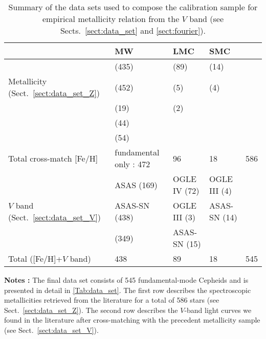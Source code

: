 \documentclass[article]{aa} %
\begin{document}
\begin{table*}[]
\caption{\label{Tab:bilan} Summary of the data sets used to compose the calibration sample for empirical metallicity relation from the $V$ band (see Sects.~\ref{sect:data_set} and \ref{sect:fourier}).}
\begin{center}
\begin{tabular}{l|l|l|l|c}
\hline
\hline
        &MW     &       LMC     &       SMC     &               \\
\hline
                &\cite{Luck2018} (435)          &       \cite{Romaniello2022}(89)       &       \cite{Romaniello2008}(14)       &               \\
Metallicity (Sect.~\ref{sect:data_set_Z})     & \cite{Groenewegen2018} (452)    &       \cite{Lemasle2017} (5)     &       \cite{Lemasle2017} (4)  &               \\
                &  \cite{Ripepi2021} (19)       &       \cite{Molinaro2012} (2)     &                                   &           \\
                &  \cite{Trentin2023} (44)       &              &                                   &            \\
                &  \cite{Kovtyukh2022} (54)       &             &                                   &            \\
                \hline
Total  cross-match [Fe/H]  &  fundamental only : 472 &                          96      &       18                         &       586     \\
                \hline
                & ASAS (169)        &   OGLE IV (72)            &       OGLE III (4)         &               \\
$V$ band   (Sect.~\ref{sect:data_set_V})     & ASAS-SN (438)    &       OGLE III (3)         &       ASAS-SN (14)            &               \\
                & \cite{Berdnikov2008} (349)    &       ASAS-SN (15)             &                               &               \\
                \hline
Total ([Fe/H]+$V$ band)  & 438  &       89                          &       18                   &       545     \\
\hline
\end{tabular}
\normalsize
\end{center}
    \begin{tablenotes}
    \item \textbf{Notes :} The final data set consists of 545 fundamental-mode Cepheids and is presented in detail in \ref{Tab:data_set}. The first row describes the spectroscopic metallicities retrieved from the literature for a total of 586 stars (see Sect.~\ref{sect:data_set_Z}). The second row describes the $V$-band light curves we found in the literature after cross-matching with the precedent metallicity sample (see Sect.~\ref{sect:data_set_V}).
    \end{tablenotes}
\end{table*}
\end{document}
